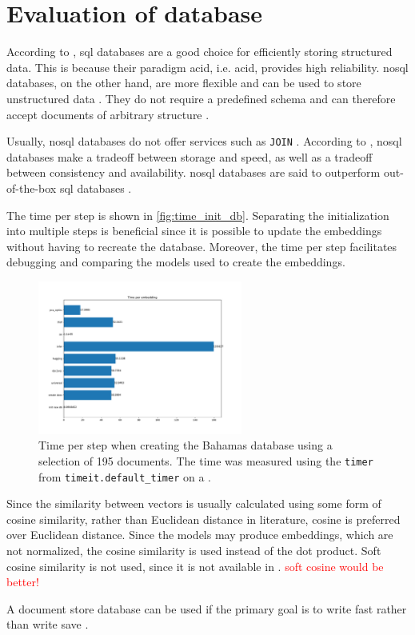 \section{Evaluation of database}\label{subsec:evaluation-db}

According to \cite{flask_book2018}, \ac{sql} databases are a good choice for efficiently storing structured data.
This is because their paradigm \acs{acid}, i.e. \acl{acid}, provides high reliability.
\ac{nosql} databases, on the other hand, are more flexible and can be used to store unstructured data \cite{flask_book2018}.
They do not require a predefined schema and can therefore accept documents of arbitrary structure \cite{flask2018}.

Usually, \ac{nosql} databases do not offer services such as \texttt{JOIN} \cite{flask2018}.
According to \citeauthor{flask2018}, \ac{nosql} databases make a tradeoff between storage and speed, as well as a tradeoff between consistency and availability.
\ac{nosql} databases are said to outperform out-of-the-box \ac{sql} databases \cite{flask2018}.

The time per step is shown in \autoref{fig:time_init_db}.
Separating the initialization into multiple steps is beneficial since it is possible to update the embeddings without having to recreate the database.
Moreover, the time per step facilitates debugging and comparing the models used to create the embeddings.

\begin{figure}[htp] %
    \centering
    \includegraphics[width=0.6\textwidth]{images/Elasticsearch/time_per_emb.pdf}
    \caption{Time per step when creating the Bahamas database using a selection of 195 documents.
    The time was measured using the \texttt{timer} from \texttt{timeit.default\_timer} on a \localMaschineStats{}.
    }
    \label{fig:time_init_db}
\end{figure}

Since the similarity between vectors is usually calculated using some form of cosine similarity, 
rather than Euclidean distance in literature, cosine is preferred over Euclidean distance. 
Since the models may produce embeddings, which are not normalized, the cosine similarity is used instead of the dot product.
Soft cosine similarity is not used, since it is not available in \databaseName{}.
\textcolor{red}{soft cosine would be better!}

A document store database can be used if the primary goal is to write fast rather than write save \cite{flask2018}.